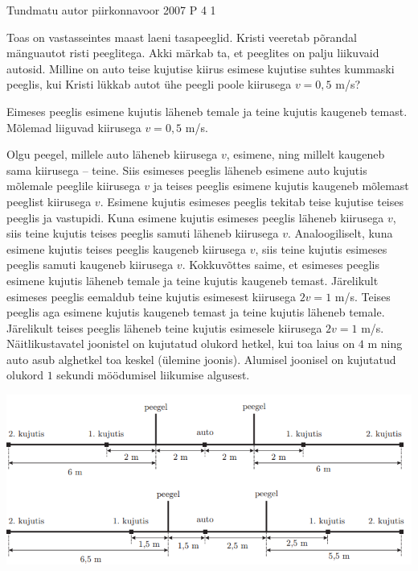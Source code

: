 {Tundmatu autor} %
{piirkonnavoor} %
{2007} %
{P 4} %
{1} %
{
\ifStatement
 Toas on vastasseintes maast laeni tasapeeglid. Kristi veeretab põrandal mänguautot risti peeglitega. Akki märkab ta, et peeglites on palju liikuvaid autosid. Milline on auto teise kujutise kiirus esimese kujutise suhtes kummaski peeglis, kui Kristi lükkab autot ühe peegli poole kiirusega $v = 0,5$ m/s?
\fi

\ifHint
Eimeses peeglis esimene kujutis läheneb temale ja teine kujutis kaugeneb temast. Mõlemad liiguvad kiirusega $v = 0,5$ m/s.
\fi


\ifSolution
Olgu peegel, millele auto läheneb kiirusega $v$, esimene, ning millelt kaugeneb sama kiirusega – teine. Siis esimeses peeglis läheneb esimene auto kujutis mõlemale peeglile kiirusega $v$ ja teises peeglis esimene kujutis kaugeneb mõlemast peeglist kiirusega $v$. Esimene kujutis esimeses peeglis tekitab teise kujutise teises peeglis ja vastupidi. Kuna esimene kujutis esimeses peeglis läheneb kiirusega $v$, siis teine kujutis teises peeglis samuti läheneb kiirusega $v$. Analoogiliselt, kuna esimene kujutis teises peeglis kaugeneb kiirusega $v$, siis teine kujutis esimeses peeglis samuti kaugeneb kiirusega $v$. Kokkuvõttes saime, et esimeses peeglis esimene kujutis läheneb temale ja teine kujutis kaugeneb temast. Järelikult esimeses peeglis eemaldub teine kujutis esimesest kiirusega $2v = 1$ m/s. Teises peeglis aga esimene kujutis kaugeneb temast ja teine kujutis läheneb temale. Järelikult teises peeglis läheneb teine kujutis esimesele kiirusega $2v = 1$ m/s. Näitlikustavatel joonistel on kujutatud olukord hetkel, kui toa laius on $4$ m ning auto asub alghetkel toa keskel (ülemine joonis). Alumisel joonisel on kujutatud olukord $1$ sekundi möödumisel liikumise algusest.
\begin{center}
	\includegraphics[width=0.5\linewidth]{2007-v2p-04-lah.PNG}
\end{center}
\fi
}
